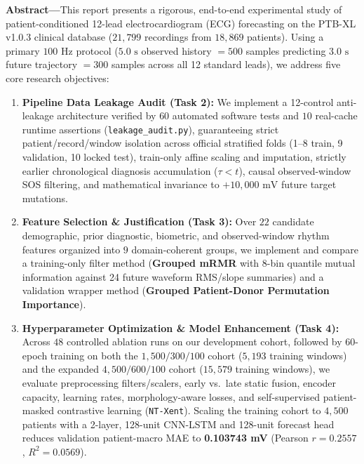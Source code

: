 \documentclass[11pt,a4paper]{article}
\begin{document}
\begin{titlepage}
    \begin{minipage}{0.92\textwidth}
        \small
        \textbf{Abstract---}This report presents a rigorous, end-to-end experimental study of patient-conditioned 12-lead electrocardiogram (ECG) forecasting on the PTB-XL v1.0.3 clinical database ($21{,}799$ recordings from $18{,}869$ patients). Using a primary $100\text{ Hz}$ protocol ($5.0\text{ s}$ observed history $= 500$ samples predicting $3.0\text{ s}$ future trajectory $= 300$ samples across all 12 standard leads), we address five core research objectives:
        \begin{enumerate}
            \item \textbf{Pipeline Data Leakage Audit (Task 2):} We implement a 12-control anti-leakage architecture verified by $60$ automated software tests and $10$ real-cache runtime assertions (\texttt{leakage\_audit.py}), guaranteeing strict patient/record/window isolation across official stratified folds (1--8 train, 9 validation, 10 locked test), train-only affine scaling and imputation, strictly earlier chronological diagnosis accumulation ($\tau < t$), causal observed-window SOS filtering, and mathematical invariance to $+10{,}000\text{ mV}$ future target mutations.
            \item \textbf{Feature Selection \& Justification (Task 3):} Over $22$ candidate demographic, prior diagnostic, biometric, and observed-window rhythm features organized into $9$ domain-coherent groups, we implement and compare a training-only filter method (\textbf{Grouped mRMR} with 8-bin quantile mutual information against 24 future waveform RMS/slope summaries) and a validation wrapper method (\textbf{Grouped Patient-Donor Permutation Importance}).
            \item \textbf{Hyperparameter Optimization \& Model Enhancement (Task 4):} Across $48$ controlled ablation runs on our development cohort, followed by 60-epoch training on both the $1{,}500 / 300 / 100$ cohort ($5{,}193$ training windows) and the expanded $4{,}500 / 600 / 100$ cohort ($15{,}579$ training windows), we evaluate preprocessing filters/scalers, early vs.\ late static fusion, encoder capacity, learning rates, morphology-aware losses, and self-supervised patient-masked contrastive learning (\texttt{NT-Xent}). Scaling the training cohort to $4{,}500$ patients with a 2-layer, 128-unit CNN-LSTM and 128-unit forecast head reduces validation patient-macro MAE to \textbf{0.103743 mV} (Pearson $r = 0.2557$, $R^2 = 0.0569$).

\end{enumerate}
\end{minipage}
\end{titlepage}
\end{document}
